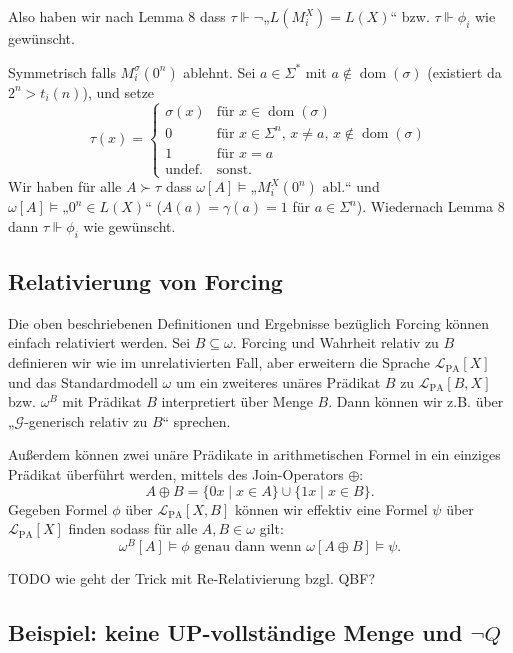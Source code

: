 \documentclass[nofonts]{uebung}
\DeclareMathOperator{\dom}{dom}
\begin{document}
Also haben wir nach Lemma 8 dass $\tau\Vdash \neg„L(M_i^X)=L(X)“$ bzw. $\tau\Vdash\phi_i$ wie gewünscht.

Symmetrisch falls $M_i^\sigma(0^n)$ ablehnt. Sei $a\in\Sigma^*$ mit $a\not\in\dom(\sigma)$ (existiert da $2^n>t_i(n)$), und setze 
\[ \tau(x) =\begin{cases} \sigma(x) & \text{für $x\in\dom(\sigma)$}\\0&\text{für $x\in\Sigma^n$, $x\neq a$, $x\not\in\dom(\sigma)$}\\1&\text{für $x=a$}\\\text{undef.} & \text{sonst}.\end{cases} \]
Wir haben für alle $A\succ\tau$ dass $\omega[A] \vDash „M_i^X(0^n)\text{ abl.}“$  und $\omega[A] \vDash „0^n\in L(X)“$ ($A(a)=\gamma(a)=1$ für $a\in\Sigma^n$).
Wiedernach Lemma 8 dann $\tau\Vdash\phi_i$ wie gewünscht.


\subsection*{Relativierung von Forcing}

Die oben beschriebenen Definitionen und Ergebnisse bezüglich Forcing können einfach relativiert werden. Sei $B\subseteq \omega$. Forcing und Wahrheit relativ zu $B$ definieren wir wie im unrelativierten Fall, aber erweitern die Sprache $\mathcal L_{\mathrm{PA}}[X]$ und das Standardmodell $\omega$ um ein zweiteres unäres Prädikat $B$ zu $\mathcal L_{\mathrm{PA}}[B,X]$ bzw. $\omega^B$ mit Prädikat $B$ interpretiert über Menge $B$. Dann können wir z.B. über „$\mathcal G$-generisch relativ zu $B$“ sprechen.

Außerdem können zwei unäre Prädikate in arithmetischen Formel in ein einziges Prädikat überführt werden, mittels des Join-Operators $\oplus$: 
\[ A\oplus B = \{0x\mid x\in A\}\cup\{1x\mid x\in B\}. \]
Gegeben Formel $\phi$ über $\mathcal L_{\mathrm{PA}}[X,B]$ können wir effektiv eine Formel $\psi$ über $\mathcal L_{\mathrm{PA}}[X]$ finden sodass für alle $A,B\in\omega$ gilt:
\[ \omega^B[A] \vDash \phi \text{ genau dann wenn } \omega[A\oplus B]\vDash \psi. \]

TODO wie geht der Trick mit Re-Relativierung bzgl. QBF?


\subsection*{Beispiel: keine UP-vollständige Menge und $\neg Q$}
\end{document}
